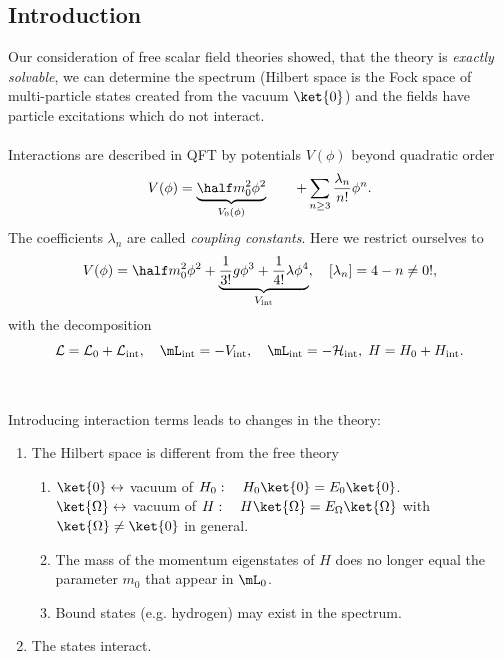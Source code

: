\subsection{Introduction}
Our consideration of free scalar field theories showed, that the theory is \emph{exactly solvable}, we can determine the spectrum (Hilbert space is the Fock space of multi-particle states created from the vacuum $\ket{0}$) and the fields have particle excitations which do not interact.\\
\\
Interactions are described in QFT by potentials $V(\phi)$ beyond quadratic order
\begin{equation}
	V(\phi) = \underbrace{\half m^2_0 \phi^2}_{V_0 (\phi)} \qquad + \sum_{n\geq 3} \frac{\lambda_n}{n!} \phi^n.
\end{equation}
The coefficients $\lambda_n$ are called \emph{coupling constants}. Here we restrict ourselves to
\begin{equation}
V(\phi) = \half m^2_0 \phi^2 +\underbrace{\frac{1}{3!} g \phi^3+\frac{1}{4!} \lambda \phi^4}_{V_{\mathrm{int}}},\quad [\lambda_n]=4-n \neq 0 !,
\end{equation}
with the decomposition 
\begin{equation}
	\mathcal{L}=\mathcal{L}_0 +\mathcal{L}_{\mathrm{int}},\quad \mL_{\mathrm{int}}=-V_{\mathrm{int}}, \quad  \mL_{\mathrm{int}}=-\mathcal{H}_{\mathrm{int}},\; H=H_0 +H_{\mathrm{int}}.
\end{equation}
\\
\\
Introducing interaction terms leads to changes in the theory:\\
\begin{enumerate}
	\item The Hilbert space is different from the free theory
	\begin{enumerate}
		\item $\ket{0}\leftrightarrow$ vacuum of $H_0:\quad H_0\ket{0} =E_0 \ket{0}$.\\
		  $\ket{\Omega}\leftrightarrow$ vacuum of $H:\quad H\ket{\Omega}=E_{\Omega} \ket{\Omega}$
		with $\ket{\Omega}\neq \ket{0}$ in general.
		\item The mass of the momentum eigenstates of $H$ does no longer equal the parameter $m_0$ that appear in $\mL_0$.
		\item Bound states (e.g. hydrogen) may exist in the spectrum.
		\end{enumerate}
	\item The states interact.
\end{enumerate}
